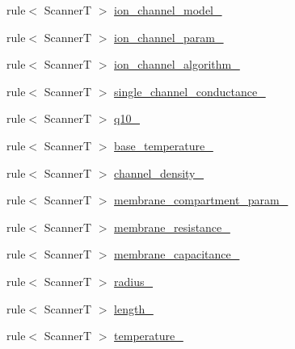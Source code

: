 \begin{DoxyCompactItemize}
\item 
rule$<$ ScannerT $>$ \hyperlink{struct_modigliani_model_format_grammar__t_1_1definition_afa6a1fb337d41f29eaf6c0e6f3f56c7e}{ion\_\-channel\_\-model\_\-}
\item 
rule$<$ ScannerT $>$ \hyperlink{struct_modigliani_model_format_grammar__t_1_1definition_aaa9b07bff73295fff68db298a2a4b1b1}{ion\_\-channel\_\-param\_\-}
\item 
rule$<$ ScannerT $>$ \hyperlink{struct_modigliani_model_format_grammar__t_1_1definition_a90123f5751ffb371f75920097a436502}{ion\_\-channel\_\-algorithm\_\-}
\item 
rule$<$ ScannerT $>$ \hyperlink{struct_modigliani_model_format_grammar__t_1_1definition_a5efd98051e0e7abba2fea09c630852c0}{single\_\-channel\_\-conductance\_\-}
\item 
rule$<$ ScannerT $>$ \hyperlink{struct_modigliani_model_format_grammar__t_1_1definition_a6c2671de8e754906131d75b61416ed40}{q10\_\-}
\item 
rule$<$ ScannerT $>$ \hyperlink{struct_modigliani_model_format_grammar__t_1_1definition_ab52db4dda0d06c21c0d8bf2901210cea}{base\_\-temperature\_\-}
\item 
rule$<$ ScannerT $>$ \hyperlink{struct_modigliani_model_format_grammar__t_1_1definition_af213752dbd799ce5d3b9826e67a87eb7}{channel\_\-density\_\-}
\item 
rule$<$ ScannerT $>$ \hyperlink{struct_modigliani_model_format_grammar__t_1_1definition_ac8b0964ac7d8adbaa00a2a0bbb988064}{membrane\_\-compartment\_\-param\_\-}
\item 
rule$<$ ScannerT $>$ \hyperlink{struct_modigliani_model_format_grammar__t_1_1definition_a4c2ce9292a0e70e3cf7f0956c2a1f2cb}{membrane\_\-resistance\_\-}
\item 
rule$<$ ScannerT $>$ \hyperlink{struct_modigliani_model_format_grammar__t_1_1definition_a916defa498620899b23876685b130d78}{membrane\_\-capacitance\_\-}
\item 
rule$<$ ScannerT $>$ \hyperlink{struct_modigliani_model_format_grammar__t_1_1definition_aa819398f92f6fc257948d09a0097c4b5}{radius\_\-}
\item 
rule$<$ ScannerT $>$ \hyperlink{struct_modigliani_model_format_grammar__t_1_1definition_a5cd46069fcf29afd54f96f0fbb2366c4}{length\_\-}
\item 
rule$<$ ScannerT $>$ \hyperlink{struct_modigliani_model_format_grammar__t_1_1definition_ae280c6d1c6bbfd8fb277876a6c65c2d5}{temperature\_\-}
\end{DoxyCompactItemize}


